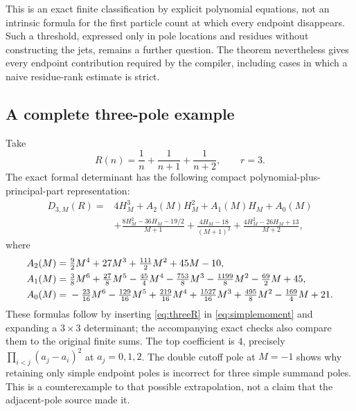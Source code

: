 \documentclass[11pt,letterpaper]{article}
\numberwithin{equation}{section}
\theoremstyle{definition}\newtheorem{definition}[theorem]{Definition}
\theoremstyle{remark}\newtheorem{remark}[theorem]{Remark}
\begin{document}
This is an exact finite classification by explicit polynomial equations,
not an intrinsic formula for the first particle count at which every
endpoint disappears. Such a threshold, expressed only in pole locations
and residues without constructing the jets, remains a further question.
The theorem nevertheless gives every endpoint contribution required by
the compiler, including cases in which a naive residue-rank estimate is
strict.

\subsection{A complete three-pole example}

Take
\begin{equation}\label{eq:threeR}
          R(n)=\frac1n+\frac1{n+1}+\frac1{n+2},\qquad r=3.
\end{equation}
The exact formal determinant has the following compact
polynomial-plus-principal-part representation:
\begin{equation}\label{eq:threeformal}
 \begin{split}
 D_{3,M}(R)={}&4H_M^3+A_2(M)H_M^2+A_1(M)H_M+A_0(M)\\
 &+\frac{8H_M^2-36H_M-19/2}{M+1}
   +\frac{4H_M-18}{(M+1)^2}
   +\frac{4H_M^2-26H_M+13}{M+2},
 \end{split}
\end{equation}
where
\begin{align}
 A_2(M)={}&\tfrac92M^4+27M^3+\tfrac{111}2M^2+45M-10,\notag\\
 A_1(M)={}&\tfrac38M^6+\tfrac{27}8M^5-\tfrac{45}4M^4
       -\tfrac{753}8M^3-\tfrac{1199}8M^2-\tfrac{69}2M+45,\notag\\
 A_0(M)={}&-\tfrac{23}{16}M^6-\tfrac{129}{16}M^5
       +\tfrac{219}{16}M^4+\tfrac{1527}{16}M^3
       +\tfrac{495}8M^2-\tfrac{169}4M+21.
 \label{eq:threepolys}
\end{align}
These formulas follow by inserting \eqref{eq:threeR} in
\eqref{eq:simplemoment} and expanding a $3\times3$ determinant;
the accompanying exact checks also compare them to the original
finite sums. The top coefficient is $4$, precisely
$\prod_{i<j}(a_j-a_i)^2$ at $a_j=0,1,2$. The double cutoff pole at
$M=-1$ shows why retaining only simple endpoint poles is incorrect for
three simple summand poles. This is a counterexample to that possible
extrapolation, not a claim that the adjacent-pole source made it.
\end{document}
